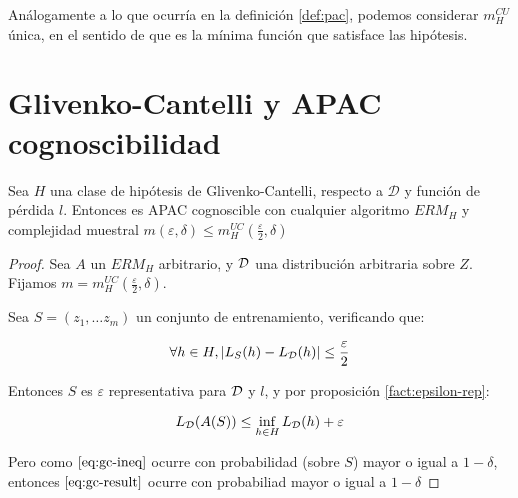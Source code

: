 Análogamente a lo que ocurría en la definición \ref{def:pac}, podemos considerar $m_H^{CU}$ única, en el sentido de
que es la mínima función que satisface las hipótesis.

\section{Glivenko-Cantelli y APAC cognoscibilidad}

\begin{theorem*}
Sea $H$ una clase de hipótesis de Glivenko-Cantelli, respecto a $\mathcal{D}$ y función de pérdida $l$. 
Entonces es APAC cognoscible con cualquier algoritmo $ERM_H$ y complejidad muestral
$m(\varepsilon, \delta) \le m_{H}^{UC} \left(\frac{\varepsilon}{2}, \delta \right)$ 
\end{theorem*}

  \begin{proof}
  Sea $A$ un $ERM_H$ arbitrario, y $\mathcal{D}$ una distribución arbitraria sobre $Z$.
  Fijamos $m = m_{H}^{UC} \left(\frac{\varepsilon}{2}, \delta \right)$.

  Sea $S = (z_1, \ldots z_m)$ un conjunto de entrenamiento, verificando que: 

  \begin{equation}
    \forall h\in H, |L_{S}(h)-L_{\mathcal{D}}(h)| \le \frac{\varepsilon}{2}
    \label{eq:gc-ineq}
  \end{equation}

  Entonces $S$ es $\varepsilon$ representativa para $\mathcal{D}$ y $l$, y por proposición \ref{fact:epsilon-rep}:

  \begin{equation}
   L_{\mathcal{D}}(A(S)) \le \inf_{h\in H} L_{\mathcal{D}}(h) + \varepsilon
   \label{eq:gc-result}
  \end{equation}

  Pero como $\eqref{eq:gc-ineq}$ ocurre con probabilidad (sobre $S$) mayor o igual a $1-\delta$, entonces $\eqref{eq:gc-result}$
  ocurre con probabiliad mayor o igual a $1-\delta$
  
  \end{proof}
  
